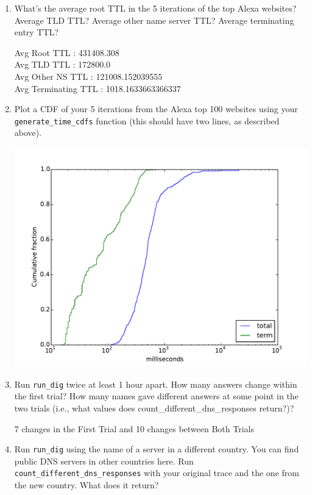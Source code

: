 \documentclass[10pt]{article}
\begin{document}
\begin{enumerate}

\item What's the average root TTL in the 5 iterations of the top Alexa websites? Average TLD TTL? Average other name server TTL? Average terminating entry TTL?

Avg Root TTL : 431408.308 \\
Avg TLD TTL : 172800.0 \\
Avg Other NS TTL : 121008.152039555 \\
Avg Terminating TTL : 1018.1633663366337 \\

\item Plot a CDF of your 5 iterations from the Alexa top 100 websites using your \texttt{generate\_time\_cdfs} function (this should have two lines, as described above).

\includegraphics[scale=0.5]{plot_dig.pdf}

\item Run \texttt{run\_dig} twice at least 1 hour apart. How many answers change within the first trial? How many names gave different answers at some point in the two trials (i.e., what values does {count\_different\_dns\_responses} return?)?

7 changes in the First Trial and 10 changes between Both Trials

\item Run \texttt{run\_dig} using the name of a server in a different country. You can find public DNS servers in other countries here.
Run \texttt{count\_different\_dns\_responses} with your original trace and the one from the new country. What does it return?


\end{enumerate}
\end{document}
